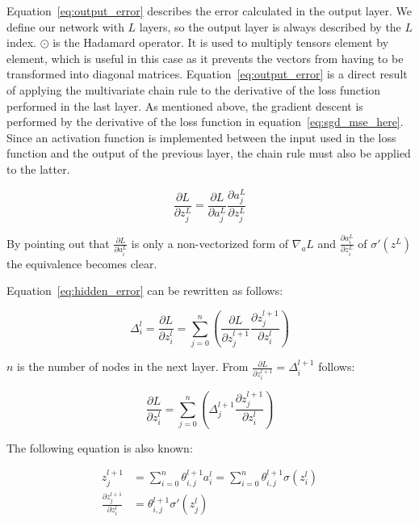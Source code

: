 Equation~\eqref{eq:output_error} describes the error calculated in the output layer. We define our network with $L$ layers, so the output layer is always described by the $L$ index.
$\odot$ is the Hadamard operator. It is used to multiply tensors element by element, which is useful in this case as it prevents the vectors from having to be transformed into diagonal matrices.
Equation~\eqref{eq:output_error} is a direct result of applying the multivariate chain rule to the derivative of the loss function performed in the last layer.
As mentioned above, the gradient descent is performed by the derivative of the loss function in equation~\eqref{eq:sgd_mse_here}.
Since an activation function is implemented between the input used in the loss function and the output of the previous layer, the chain rule must also be applied to the latter.

\begin{equation}
    \frac{\partial L}{\partial z^L_j} = \frac{\partial L}{\partial a^L_j}\frac{\partial a^L_j}{\partial z^L_j}
    \label{eq:proof_loss_chain_rule}
\end{equation}

By pointing out that $\frac{\partial L}{\partial a^L_i}$ is only a non-vectorized form of $\nabla_a L$ and $\frac{\partial a^L_i}{\partial z^L_i}$ of $\sigma'(z^L)$ the equivalence becomes clear.

Equation~\eqref{eq:hidden_error} can be rewritten as follows:

\begin{equation}
    \varDelta^l_i = \frac{\partial L}{\partial z^l_i} = \sum_{j=0}^n (\frac{\partial L}{\partial z^{l+1}_j}\frac{\partial z^{l+1}_j}{\partial z^l_i})
\end{equation}

$n$ is the number of nodes in the next layer. From $\frac{\partial L}{\partial z^{l+1}_i} = \varDelta^{l+1}_i$ follows:

\begin{equation}
    \frac{\partial L}{\partial z^l_i} = \sum_{j=0}^n (\varDelta^{l+1}_j \frac{\partial z^{l+1}_j}{\partial z^{l}_i})
    \label{eq:hidden_error_intermediate}
\end{equation}

The following equation is also known:

\begin{equation}
    \begin{split}
    z^{l+1}_j & = \sum_{i=0}^n \theta^{l+1}_{i,j} a^l_i = \sum_{i=0}^n \theta^{l+1}_{i, j} \sigma(z^l_i) \\
    \frac{\partial z_j^{l+1}}{\partial z_i^l} & = \theta^{l+1}_{i,j} \sigma'(z^l_j)
    \end{split}
\end{equation}

